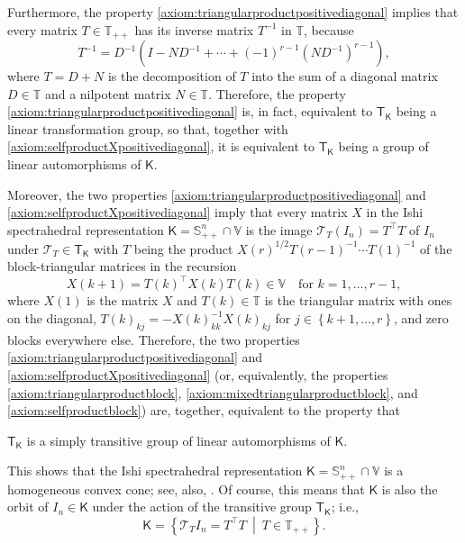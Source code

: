 \documentclass[oneside]{amsart}
\theoremstyle{plain}
\theoremstyle{definition}
\theoremstyle{remark}
\numberwithin{equation}{section}
\begin{document}
Furthermore, the property \ref{axiom:triangularproductpositivediagonal}
implies that every matrix $T \in \mathbb{T}_{++}$ has its inverse matrix
$T^{-1}$ in $\mathbb{T}$, because
\[
T^{-1} = D^{-1} (I - N D^{-1} + \dotsb + (-1)^{r-1} (N D^{-1})^{r-1}),
\]
where $T = D + N$ is the decomposition of $T$ into the sum of a diagonal
matrix $D \in \mathbb{T}$ and a nilpotent matrix $N \in \mathbb{T}$.
Therefore, the property \ref{axiom:triangularproductpositivediagonal} is,
in fact, equivalent to $\mathsf{T}_{\mathsf{K}}$ being a linear
transformation group, so that, together with
\ref{axiom:selfproductXpositivediagonal}, it is equivalent to
$\mathsf{T}_{\mathsf{K}}$ being a group of linear automorphisms of
$\mathsf{K}$.

Moreover, the two properties \ref{axiom:triangularproductpositivediagonal}
and \ref{axiom:selfproductXpositivediagonal} imply that every matrix $X$ in
the Ishi spectrahedral representation $\mathsf{K} = \mathbb{S}^{n}_{++}
\cap \mathbb{V}$ is the image $\mathcal{T}_{T}(I_{n}) = T^{\top} T$ of
$I_{n}$ under $\mathcal{T}_{T} \in \mathsf{T}_{\mathsf{K}}$ with $T$ being
the product $X(r)^{1/2} T(r-1)^{-1} \dotsb T(1)^{-1}$ of the
block-triangular matrices in the recursion
\[
X(k+1) = T(k)^{\top} X(k) T(k) \in \mathbb{V} \quad \text{for } k = 1,
\dotsc, r-1,
\]
where $X(1)$ is the matrix $X$ and $T(k) \in \mathbb{T}$ is the triangular
matrix with ones on the diagonal, $T(k)_{kj} = -X(k)_{kk}^{-1} X(k)_{kj}$
for $j \in \left\{k+1, \dotsc, r\right\}$, and zero blocks everywhere else.
Therefore, the two properties \ref{axiom:triangularproductpositivediagonal}
and \ref{axiom:selfproductXpositivediagonal} (or, equivalently, the
properties \ref{axiom:triangularproductblock},
\ref{axiom:mixedtriangularproductblock}, and \ref{axiom:selfproductblock})
are, together, equivalent to the property that
\begin{enumerate}[label={[T]},ref={[T]}]
\item\label{axiom:automorphismgroup}%
$\mathsf{T}_{\mathsf{K}}$ is a simply transitive group of linear
automorphisms of $\mathsf{K}$.

\end{enumerate}
This shows that the Ishi spectrahedral representation $\mathsf{K} =
\mathbb{S}^{n}_{++} \cap \mathbb{V}$ is a homogeneous convex cone; see,
also, \cite[Proposition~2 and Theorem~3]{Ishi15}. Of course, this means
that $\mathsf{K}$ is also the orbit of $I_{n} \in \mathsf{K}$ under the
action of the transitive group $\mathsf{T}_{\mathsf{K}}$; i.e.,
\[
\mathsf{K} = \left\{\mathcal{T}_{T} I_{n} = T^{\top} T\ \middle|\ T \in
\mathbb{T}_{++}\right\}.
\]
\end{document}
